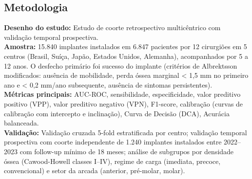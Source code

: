 \subsection{Metodologia}
\textbf{Desenho do estudo:} Estudo de coorte retrospectivo multicêntrico
com validação temporal prospectiva. \\
\textbf{Amostra:} 15.840 implantes instalados em 6.847 pacientes por
12 cirurgiões em 5 centros (Brasil, Suíça, Japão, Estados Unidos,
Alemanha), acompanhados por 5 a 12 anos. O desfecho primário foi
sucesso do implante (critérios de Albrektsson modificados: ausência
de mobilidade, perda óssea marginal < 1,5 mm no primeiro ano e < 0,2
mm/ano subsequente, ausência de sintomas persistentes). \\
\textbf{Métricas principais:} AUC-ROC, sensibilidade, especificidade,
valor preditivo positivo (VPP), valor preditivo negativo (VPN), F1-score,
calibração (curvas de calibração com intercepto e inclinação), Curva de
Decisão (DCA), Acurácia balanceada. \\
\textbf{Validação:} Validação cruzada 5-fold estratificada por centro;
validação temporal prospectiva com coorte independente de 1.240 implantes
instalados entre 2022--2023 com follow-up mínimo de 18 meses; análise de
subgrupos por densidade óssea (Cawood-Howell classes I--IV), regime de
carga (imediata, precoce, convencional) e setor da arcada (anterior,
pré-molar, molar).

